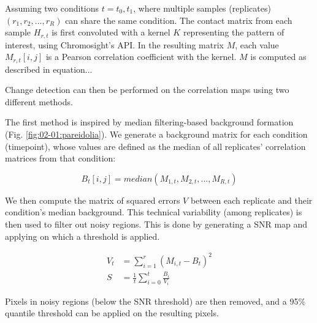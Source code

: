 Assuming two conditions $t={t_0, t_1}$, where multiple samples (replicates) $(r_1, r_2, ..., r_R)$ can share the same condition. The contact matrix from each sample $H_{r, t}$ is first convoluted with a kernel $K$ representing the pattern of interest, using Chromosight's \acrshort{API}. In the resulting matrix $M$, each value $M_{r, t}[i, j]$ is a Pearson correlation coefficient with the kernel. $M$ is computed as described in equation...

Change detection can then be performed on the correlation maps using two different methods.

The first method is inspired by median filtering-based background formation (Fig. \ref{fig:02-01:pareidolia}). We generate a background matrix for each condition (timepoint), whose values are defined as the median of all replicates' correlation matrices from that condition: 

\begin{equation}
    B_t[i, j] = median(M_{1, t}, M_{2, t}, ..., M_{R, t})
\end{equation}

We then compute the matrix of squared errors $V$ between each replicate and their condition's median background. This technical variability (among replicates) is then used to filter out noisy regions. This is done by generating a \acrfull{SNR} map and applying on which a threshold is applied.

\begin{align}
    V_t &= \sum_{i=1}^r{(M_{i, t} - B_t)^2} \\
    S &= \frac{1}{t} \sum_{i=0}^t{\frac{B_i}{V_i}}
\end{align}

Pixels in noisy regions (below the \acrshort{SNR} threshold) are then removed, and a 95\% quantile threshold can be applied on the resulting pixels.

